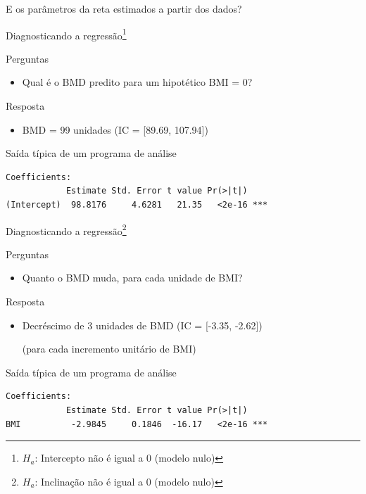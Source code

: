 \documentclass{beamer}
\begin{document}
\begin{frame}
  \begin{center}
    E os parâmetros da reta estimados a partir dos dados?
  \end{center}
\end{frame}

\begin{frame}[fragile]{Diagnosticando a regressão\footnote{\scriptsize $H_a$: Intercepto não é igual a 0 (modelo nulo)}}
  \begin{block}{Perguntas}
    \begin{itemize}
      \footnotesize
    \item Qual é o BMD predito para um hipotético BMI = 0?
    \end{itemize}
  \end{block}
  \bigskip
  \begin{exampleblock}{Resposta}
    \begin{itemize}
    \item BMD = 99 unidades \footnotesize (IC = [89.69, 107.94])
    \end{itemize}
  \end{exampleblock}
  \vfill
  \begin{exampleblock}{Saída típica de um programa de análise}
    \scriptsize
\begin{verbatim}
Coefficients:
            Estimate Std. Error t value Pr(>|t|)    
(Intercept)  98.8176     4.6281   21.35   <2e-16 ***
\end{verbatim}
\end{exampleblock}
\end{frame}

\begin{frame}[fragile]{Diagnosticando a regressão\footnote{\scriptsize $H_a$: Inclinação não é igual a 0 (modelo nulo)}}
  \begin{block}{Perguntas}
    \begin{itemize}
      \footnotesize
    \item Quanto o BMD muda, para cada unidade de BMI?
    \end{itemize}
  \end{block}
  \bigskip
    \begin{exampleblock}{Resposta}
      \begin{itemize}
      \item Decréscimo de 3 unidades de BMD \footnotesize (IC = [-3.35, -2.62])

        \bigskip
        \scriptsize (para cada incremento unitário de BMI)
    \end{itemize}
  \end{exampleblock}
  \vfill
  \begin{exampleblock}{Saída típica de um programa de análise}
    \scriptsize
\begin{verbatim}
Coefficients:
            Estimate Std. Error t value Pr(>|t|)    
BMI          -2.9845     0.1846  -16.17   <2e-16 ***
\end{verbatim}
\end{exampleblock}
\end{frame}
\end{document}
